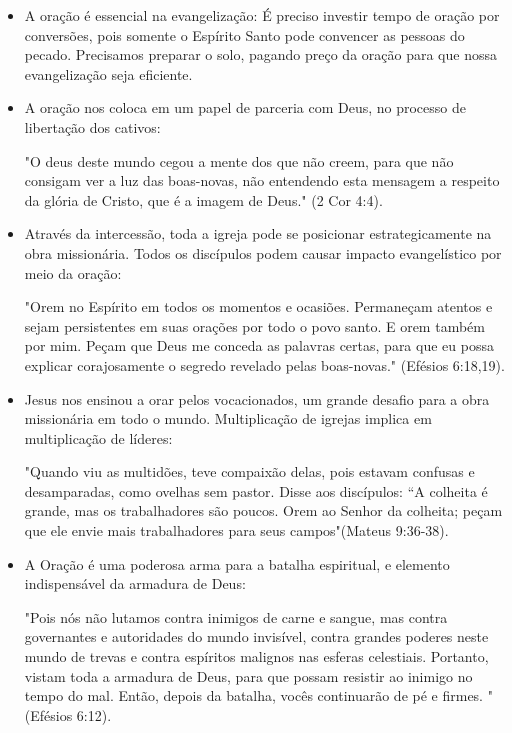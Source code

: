 \documentclass[12pt]{abntex2}
\begin{document}
  \begin{itemize}
	\item A oração é essencial na evangelização: É preciso investir tempo de oração por conversões, pois somente o Espírito Santo pode convencer as pessoas do pecado. Precisamos preparar o solo, pagando preço da oração para que nossa evangelização seja eficiente.
	\item A oração nos coloca em um papel de parceria com Deus, no processo de libertação dos cativos: \begin{citacao}"O deus deste mundo cegou a mente dos que não creem, para que não consigam ver a luz das boas-novas, não entendendo esta mensagem a respeito da glória de Cristo, que é a imagem de Deus." (2 Cor 4:4).\end{citacao}
	\item Através da intercessão, toda a igreja pode se posicionar estrategicamente na obra missionária. Todos os discípulos podem causar impacto evangelístico por meio da oração: \begin{citacao}"Orem no Espírito em todos os momentos e ocasiões. Permaneçam atentos e sejam persistentes em suas orações por todo o povo santo. E orem também por mim. Peçam que Deus me conceda as palavras certas, para que eu possa explicar corajosamente o segredo revelado pelas boas-novas." (Efésios 6:18,19).\end{citacao}
	\item Jesus nos ensinou a orar pelos vocacionados, um grande desafio para a obra missionária em todo o mundo. Multiplicação de igrejas implica em multiplicação de líderes: \begin{citacao}"Quando viu as multidões, teve compaixão delas, pois estavam confusas e desamparadas, como ovelhas sem pastor. Disse aos discípulos: “A colheita é grande, mas os trabalhadores são poucos. Orem ao Senhor da colheita; peçam que ele envie mais trabalhadores para seus campos"(Mateus 9:36-38).\end{citacao}
	\item A Oração é uma poderosa arma para a batalha espiritual, e elemento indispensável da armadura de Deus: \begin{citacao}"Pois nós não lutamos contra inimigos de carne e sangue, mas contra governantes e autoridades do mundo invisível, contra grandes poderes neste mundo de trevas e contra espíritos malignos nas esferas celestiais. Portanto, vistam toda a armadura de Deus, para que possam resistir ao inimigo no tempo do mal. Então, depois da batalha, vocês continuarão de pé e firmes. "(Efésios 6:12).\end{citacao}
  
	\cite[p. 32-34]{brandao}
\end{itemize}
\end{document}

